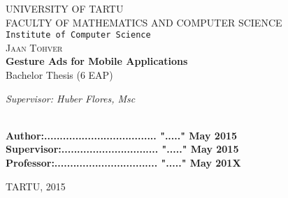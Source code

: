\begin{titlepage}

\begin{center}



\textsc{UNIVERSITY OF TARTU}\\

\textsc{FACULTY OF MATHEMATICS AND COMPUTER SCIENCE}\\

\texttt{Institute of Computer Science}\\



\textsc{ \large Jaan Tohver}\\[0.5cm]
{ \Huge \bfseries Gesture Ads for Mobile Applications}\\[0.5cm]
{\large Bachelor Thesis (6 EAP)}\\[3cm]



\begin{minipage}{0.8\textwidth}
\begin{flushright} \large
\emph{Supervisor: Huber Flores, Msc}  \\	  %
\end{flushright}
\end{minipage}

\textbf{}\\[1.0cm]

\textbf{Author:.................................... "....." May   2015}\\[0.5cm]

\textbf{Supervisor:............................... "....." May   2015}\\[0.5cm]

\textbf{Professor:................................. "....." May   201X}\\[0.5cm]        

\vfill

{\large TARTU, 2015}

\end{center}

\end{titlepage}
